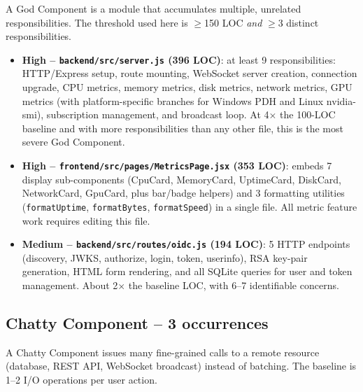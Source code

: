 A God Component is a module that accumulates multiple, unrelated
responsibilities. The threshold used here is $\geq$150 LOC \emph{and} $\geq$3
distinct responsibilities.

\begin{itemize}
  \item \textbf{High -- \texttt{backend/src/server.js} (396 LOC)}: at least 9
    responsibilities: HTTP/Express setup, route mounting, WebSocket server
    creation, connection upgrade, CPU metrics, memory metrics, disk metrics,
    network metrics, GPU metrics (with platform-specific branches for Windows
    PDH and Linux nvidia-smi), subscription management, and broadcast loop.
    At 4$\times$ the 100-LOC baseline and with more responsibilities than any
    other file, this is the most severe God Component.

  \item \textbf{High -- \texttt{frontend/src/pages/MetricsPage.jsx} (353 LOC)}:
    embeds 7 display sub-components (CpuCard, MemoryCard, UptimeCard,
    DiskCard, NetworkCard, GpuCard, plus bar/badge helpers) and 3 formatting
    utilities (\texttt{formatUptime}, \texttt{formatBytes},
    \texttt{formatSpeed}) in a single file. All metric feature work requires
    editing this file.

  \item \textbf{Medium -- \texttt{backend/src/routes/oidc.js} (194 LOC)}: 5
    HTTP endpoints (discovery, JWKS, authorize, login, token, userinfo), RSA
    key-pair generation, HTML form rendering, and all SQLite queries for user
    and token management. About 2$\times$ the baseline LOC, with 6--7
    identifiable concerns.
\end{itemize}

\subsection*{Chatty Component -- 3 occurrences}

A Chatty Component issues many fine-grained calls to a remote resource
(database, REST API, WebSocket broadcast) instead of batching. The baseline
is 1--2 I/O operations per user action.

